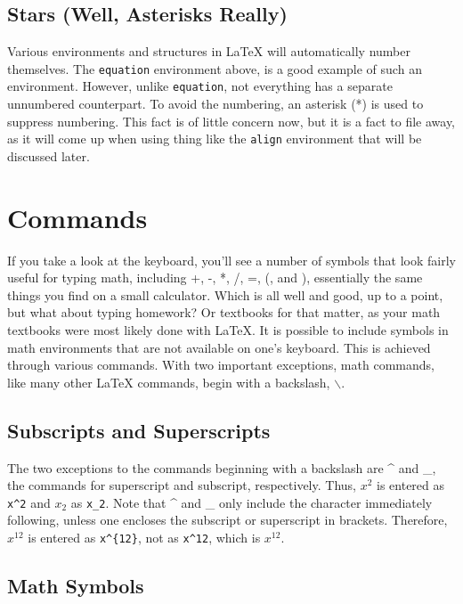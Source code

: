 \subsection{Stars (Well, Asterisks Really)}
\label{sec:stars-well-asterisks}

Various environments and structures in \LaTeX{} will automatically
number themselves. The \texttt{equation} environment above, is
a good example of such an environment.
However, unlike \texttt{equation}, not everything has a separate
unnumbered counterpart.  To avoid the numbering, an asterisk (*) is
used to suppress numbering.  This fact is of little concern now, but it
is a fact to file away, as it will come up when using thing like
the \texttt{align} environment that will be discussed later.

\section{Commands}
\label{sec:commands}

If you take a look at the keyboard, you'll see a number of symbols
that look fairly useful for typing math, including +, -, *, /, =, (,
and ), essentially the same things you find on a small calculator.
Which is all well and good, up to a point, but what about typing
homework?  Or textbooks for that matter, as your math textbooks were
most likely done with \LaTeX{}.  It is possible to include symbols in
math environments that are not available on one's keyboard.  This is
achieved through various commands.  With two important exceptions,
math commands, like many other \LaTeX{} commands, begin with a
backslash, $\backslash$.

\subsection{Subscripts and Superscripts}
\label{sec:subscr-superscr}

The two exceptions to the commands beginning with a backslash are \^{}
and \_, the commands for superscript and subscript, respectively.
Thus, $x^2$ is entered as \verb=x^2= and $x_2$ as \verb=x_2=.  Note
that \^{} and \_ only include the character immediately following,
unless one encloses the subscript or superscript in brackets.
Therefore, $x^{12}$ is entered as \verb=x^{12}=, not as \verb=x^12=,
which is $x^12$.

\subsection{Math Symbols}
\label{sec:math-symbols}

